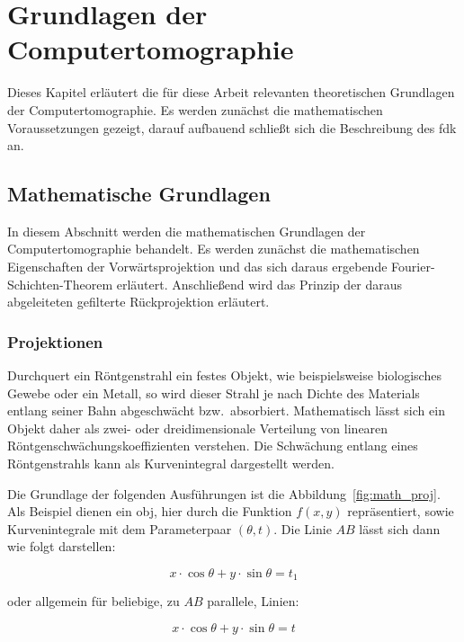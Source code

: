 \chapter{Grundlagen der Computertomographie}\label{grundlagen_bp}

Dieses Kapitel erläutert die für diese Arbeit relevanten theoretischen Grundlagen der Computertomographie. Es werden
zunächst die mathematischen Voraussetzungen gezeigt, darauf aufbauend schließt sich die Beschreibung des \gls{fdk} an.

\section{Mathematische Grundlagen}

In diesem Abschnitt werden die mathematischen Grundlagen der Computertomographie behandelt. Es werden zunächst die
mathematischen Eigenschaften der Vorwärtsprojektion und das sich daraus ergebende Fourier-Schichten-Theorem erläutert.
Anschließend wird das Prinzip der daraus abgeleiteten gefilterte Rückprojektion erläutert.

\subsection{Projektionen}

Durchquert ein Röntgenstrahl ein festes Objekt, wie beispielsweise biologisches Gewebe oder ein Metall, so wird dieser
Strahl je nach Dichte des Materials entlang seiner Bahn abgeschwächt bzw.\ absorbiert. Mathematisch lässt sich ein
Objekt daher als zwei- oder dreidimensionale Verteilung von linearen Röntgenschwächungskoeffizienten verstehen. Die
Schwächung entlang eines Röntgenstrahls kann als Kurvenintegral dargestellt werden.

Die Grundlage der folgenden Ausführungen ist die Abbildung~\ref{fig:math_proj}. Als Beispiel dienen ein \gls{obj}, hier
durch die Funktion $f(x, y)$ repräsentiert, sowie Kurvenintegrale mit dem Parameterpaar $(\theta, t)$. Die Linie $AB$
lässt sich dann wie folgt darstellen:

\begin{equation*}
    x \cdot \cos \theta + y \cdot \sin \theta  = t_1
\end{equation*}

oder allgemein für beliebige, zu $AB$ parallele, Linien:

\begin{equation}\label{eq:proj_obj}
    x \cdot \cos \theta + y \cdot \sin \theta = t
\end{equation}

